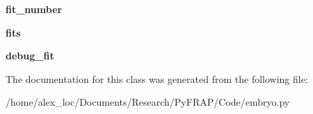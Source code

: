 \begin{DoxyCompactItemize}
\item 
\hypertarget{classembryo_1_1embryo_a95c0d980a1f47bd0b676bc6c45559cc8}{{\bfseries fit\+\_\+number}}\label{classembryo_1_1embryo_a95c0d980a1f47bd0b676bc6c45559cc8}

\item 
\hypertarget{classembryo_1_1embryo_a96df10bf6666274a710d367b3cee1c95}{{\bfseries fits}}\label{classembryo_1_1embryo_a96df10bf6666274a710d367b3cee1c95}

\item 
\hypertarget{classembryo_1_1embryo_ac77512e3887e49ca8852f4cbf722d3fd}{{\bfseries debug\+\_\+fit}}\label{classembryo_1_1embryo_ac77512e3887e49ca8852f4cbf722d3fd}

\end{DoxyCompactItemize}


The documentation for this class was generated from the following file\+:\begin{DoxyCompactItemize}
\item 
/home/alex\+\_\+loc/\+Documents/\+Research/\+Py\+F\+R\+A\+P/\+Code/embryo.\+py\end{DoxyCompactItemize}
